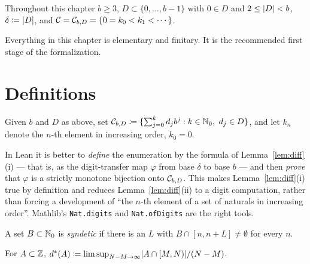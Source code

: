 \label{chap:cantor}

Throughout this chapter $b \geq 3$, $D \subset \{0,\dots,b-1\}$ with $0 \in D$ and
$2 \leq \lvert D \rvert < b$, $\delta \coloneqq \lvert D \rvert$, and
$\mathcal{C} = \mathcal{C}_{b,D} = \{0 = k_0 < k_1 < \cdots\}$.

Everything in this chapter is elementary and finitary.  It is the recommended first stage of
the formalization.

\section{Definitions}

\begin{definition}
  \label{def:cantor}
  \leanok
  Given $b$ and $D$ as above, set
  $\mathcal{C}_{b,D} \coloneqq \{ \sum_{j=0}^{k} d_j b^j : k \in \mathbb{N}_0,\ d_j \in D \}$,
  and let $k_n$ denote the $n$-th element in increasing order, $k_0 = 0$.
\end{definition}

\begin{remark}
  In Lean it is better to \emph{define} the enumeration by the formula of
  Lemma~\ref{lem:diff}(i) --- that is, as the digit-transfer map $\varphi$ from base $\delta$
  to base $b$ --- and then \emph{prove} that $\varphi$ is a strictly monotone bijection onto
  $\mathcal{C}_{b,D}$.  This makes Lemma~\ref{lem:diff}(i) true by definition and reduces
  Lemma~\ref{lem:diff}(ii) to a digit computation, rather than forcing a development of
  ``the $n$-th element of a set of naturals in increasing order''.  Mathlib's
  \texttt{Nat.digits} and \texttt{Nat.ofDigits} are the right tools.
\end{remark}

\begin{definition}
  \label{def:syndetic}
  \leanok
  A set $B \subset \mathbb{N}_0$ is \emph{syndetic} if there is an $L$ with
  $B \cap [n, n+L] \neq \emptyset$ for every $n$.
\end{definition}

\begin{definition}
  \label{def:banach-density}
  \leanok
  For $A \subset \mathbb{Z}$,
  $d^{\ast}(A) \coloneqq \limsup_{N - M \to \infty} \lvert A \cap [M,N) \rvert / (N-M)$.
\end{definition}

